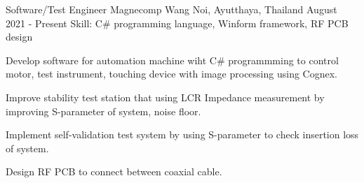 
\begin{cventries}

  \cventry
    {Software/Test Engineer} %
    {Magnecomp} %
    {Wang Noi, Ayutthaya, Thailand} %
    {August 2021 - Present} %
    {Skill: C\# programming language, Winform framework, RF PCB design} %
    {
      \begin{cvitems} %
      \item {Develop software for automation machine wiht C# programmming
        to control motor, test instrument, touching device with image
        processing using Cognex.}
      \item {Improve stability test station that using LCR Impedance measurement
        by improving S-parameter of system, noise floor.}
      \item {Implement self-validation test system by using S-parameter to
        check insertion loss of system.}
      \item {Design RF PCB to connect between coaxial cable.}
      \end{cvitems}
    }


\end{cventries}
